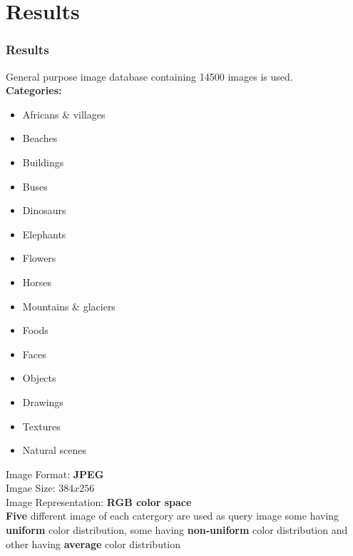 \documentclass[9pt]{beamer}
\begin{document}
\section{Results}
\begin{frame}
\frametitle{Results}
\pause
General purpose image database containing 14500 images is used.\\[\baselineskip]
\pause
\textbf{Categories: }\\[\baselineskip]
\pause
\begin{multicols}{4}
    \begin{itemize}[label=$\blacksquare$]
        \item Africans \& villages
        \item Beaches
        \item Buildings
        \item Buses
        \item Dinosaurs
        \item Elephants
        \item Flowers
        \item Horses
        \item Mountains \& glaciers
        \item Foods
        \item Faces
        \item Objects
        \item Drawings
        \item Textures
        \item Natural scenes\\[\baselineskip]
    \end{itemize}
\end{multicols}
\pause
Image Format:\textbf{ JPEG}\\
Imgae Size: \textbf{$384x256$}\\
Image Representation: \textbf{RGB color space}\\[\baselineskip]
\pause
\textbf{Five} different image of each catergory are used as query image some having \textbf{uniform} color distribution, some having \textbf{non-uniform} color distribution and other having \textbf{average} color distribution\\

\end{frame}
\end{document}
